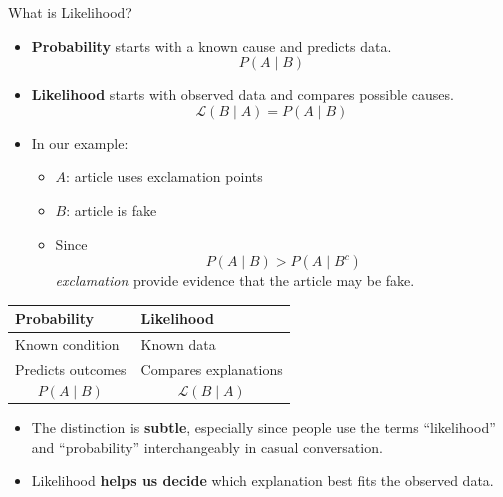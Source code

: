 \documentclass[12pt]{beamer}
\begin{document}
\begin{frame}{}
\begin{block}{What is Likelihood?}
\begin{itemize}
\item \textbf{Probability} starts with a known cause and predicts data.
\[
P(A \mid B)
\]
\item \textbf{Likelihood} starts with observed data and compares possible causes.
\[
\mathcal{L}(B \mid A)=P(A \mid B)
\]
\item In our example:
\begin{itemize}
\item \(A\): article uses exclamation points
\item \(B\): article is fake
\item Since
      \[
      P(A \mid B) > P(A \mid B^c)
      \]
      \emph{exclamation} provide evidence that the article may be fake.
\end{itemize}
\end{itemize}
\end{block}
\end{frame}

\begin{frame}{}
\begin{center}
\begin{tabular}{p{4cm}|p{4cm}}
\textbf{Probability} & \textbf{Likelihood} \\
\hline
Known condition & Known data \\
Predicts outcomes & Compares explanations \\
\[
P(A \mid B)
\]
& 
\[
\mathcal{L}(B \mid A)
\]
\end{tabular}
\end{center}
\begin{itemize}
\item The distinction is \textbf{subtle}, especially since people use the terms “likelihood” and “probability” interchangeably in casual conversation.
\item Likelihood \textbf{helps us decide} which explanation best fits the observed data.
\end{itemize}
\end{frame}
\end{document}
